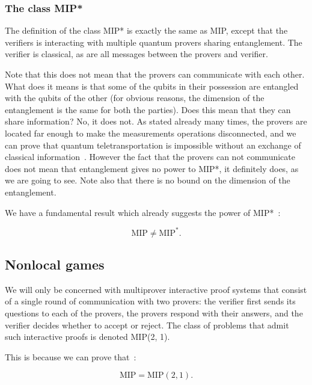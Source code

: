 \subsubsection{The class MIP*}
The definition of the class MIP* is exactly the same as MIP, except that the verifiers is interacting with multiple quantum provers sharing entanglement. The verifier is classical, as are all messages between the provers and verifier. 

Note that this does not mean that the provers can communicate with each other. What does it means is that some of the qubits in their possession are entangled with the qubits of the other (for obvious reasons, the dimension of the entanglement is the same for both the parties). Does this mean that they can share information? No, it does not. As stated already many times, the provers are located far enough to make the measurements operations disconnected, and we can prove that quantum teletransportation is impossible without an exchange of classical information~\cite{NielsenChuang}. However the fact that the provers can not communicate does not mean that entanglement gives no power to MIP*, it definitely does, as we are going to see.
Note also that there is no bound on the dimension of the entanglement.

We have a fundamental result which already suggests the power of MIP*~\cite{mipre}:

\begin{theorem}
    \begin{equation}
\text{MIP} \neq \text{MIP}^{*}.
    \end{equation}
\end{theorem}

\subsection{Nonlocal games}

We will only be concerned with multiprover interactive proof systems
that consist of a single round of communication with two provers: the verifier first sends its questions to
each of the provers, the provers respond with their answers, and the verifier decides whether to accept or
reject. The class of problems that admit such interactive proofs is denoted MIP(2, 1).

This is because we can prove that~\cite{mipre}:
\begin{theorem}
    \begin{equation}
    \text{MIP}=\text{MIP}(2,1).
    \end{equation}
\end{theorem}

